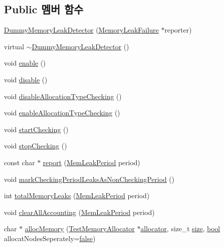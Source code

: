 \subsection*{Public 멤버 함수}
\begin{DoxyCompactItemize}
\item 
\hyperlink{class_dummy_memory_leak_detector_a6cf556e6cc5e22c9d1ac0dfd96b1eab9}{Dummy\+Memory\+Leak\+Detector} (\hyperlink{class_memory_leak_failure}{Memory\+Leak\+Failure} $\ast$reporter)
\item 
virtual \hyperlink{class_dummy_memory_leak_detector_aa69633ef4e03585da2bea27233f39338}{$\sim$\+Dummy\+Memory\+Leak\+Detector} ()
\item 
void \hyperlink{class_memory_leak_detector_a486f22824bd83c5308a0d70ffac6f758}{enable} ()
\item 
void \hyperlink{class_memory_leak_detector_a8cfbbe53c1cf6e3054736daea3044c0f}{disable} ()
\item 
void \hyperlink{class_memory_leak_detector_a87bbe373712386442509ec83e9444021}{disable\+Allocation\+Type\+Checking} ()
\item 
void \hyperlink{class_memory_leak_detector_a4ef0d2380dbe5ecfa77d2d477d9047e9}{enable\+Allocation\+Type\+Checking} ()
\item 
void \hyperlink{class_memory_leak_detector_ae912c5ee9034b76f13f1c9dbab55e512}{start\+Checking} ()
\item 
void \hyperlink{class_memory_leak_detector_a9e85551d474d895ba8852b8e56481c7c}{stop\+Checking} ()
\item 
const char $\ast$ \hyperlink{class_memory_leak_detector_acc70330c27080c4b09b96342929dc9ca}{report} (\hyperlink{_memory_leak_detector_8h_ab248e6cc6c6699b88b002286d8a3ed76}{Mem\+Leak\+Period} period)
\item 
void \hyperlink{class_memory_leak_detector_a6db202697cf20e8d84748b129c403545}{mark\+Checking\+Period\+Leaks\+As\+Non\+Checking\+Period} ()
\item 
int \hyperlink{class_memory_leak_detector_a7b0c5d9c4d678d6e0081802416660803}{total\+Memory\+Leaks} (\hyperlink{_memory_leak_detector_8h_ab248e6cc6c6699b88b002286d8a3ed76}{Mem\+Leak\+Period} period)
\item 
void \hyperlink{class_memory_leak_detector_a6c18f981e1c2139528a10aa573ffeaa9}{clear\+All\+Accounting} (\hyperlink{_memory_leak_detector_8h_ab248e6cc6c6699b88b002286d8a3ed76}{Mem\+Leak\+Period} period)
\item 
char $\ast$ \hyperlink{class_memory_leak_detector_a15c9b9fb87d6e63d8972f03e25fb3cf5}{alloc\+Memory} (\hyperlink{class_test_memory_allocator}{Test\+Memory\+Allocator} $\ast$\hyperlink{_memory_leak_warning_test_8cpp_a83fc2e9b9142613f7df2bcc3ff8292bc}{allocator}, size\+\_\+t \hyperlink{gst__avb__playbin_8c_a439227feff9d7f55384e8780cfc2eb82}{size}, \hyperlink{avb__gptp_8h_af6a258d8f3ee5206d682d799316314b1}{bool} allocat\+Nodes\+Seperately=\hyperlink{avb__gptp_8h_af6a258d8f3ee5206d682d799316314b1ae9de385ef6fe9bf3360d1038396b884c}{false})

\end{DoxyCompactItemize}
